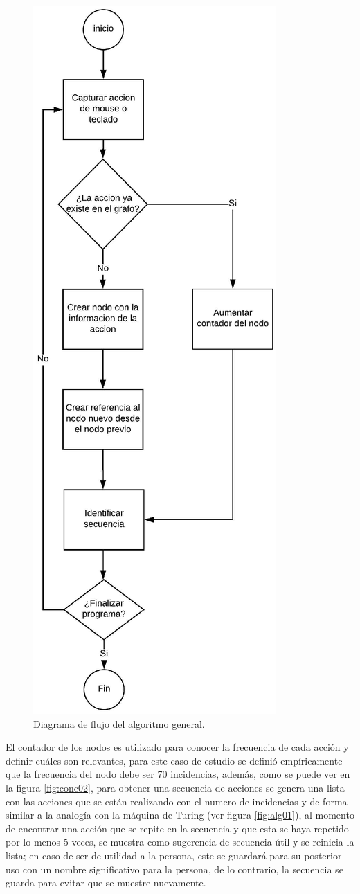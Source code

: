 \begin{figure}[]
\centering
\includegraphics[width=0.5\columnwidth]{chap4/Imagenes/concepto1.eps}
\caption{Diagrama de flujo del algoritmo general.}
\label{fig:conc01}
\end{figure} 

El contador de los nodos es utilizado para conocer la frecuencia de cada 
 acci\'on y definir cu\'ales son relevantes, para este caso de estudio se
 defini\'o emp\'iricamente que la frecuencia del nodo debe ser 70
 incidencias, 
 adem\'as, como se puede ver 
 en la figura \ref{fig:conc02}, para obtener una secuencia de acciones se
 genera una lista con las acciones que se est\'an realizando con el numero 
 de incidencias y de forma similar a la analog\'ia con la m\'aquina
 de Turing (ver figura \ref{fig:alg01}), al momento de encontrar una acci\'on
 que se repite en la secuencia y que esta se haya repetido por lo menos 5
 veces,
 se muestra como sugerencia de secuencia \'util y se reinicia la lista; en 
 caso de ser de utilidad a la persona, este se guardar\'a para su posterior 
 uso con un nombre significativo para la persona, de lo contrario, la 
 secuencia se guarda para evitar que se muestre nuevamente.

